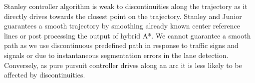 Stanley controller algorithm is weak to discontinuities along the trajectory as
it directly drives towards the closest point on the trajectory. Stanley and
Junior guarantees a smooth trajectory by smoothing already known center
reference lines or post processing the output of hybrid A*. We cannot guarantee
a smooth path as we use discontinuous predefined path in response to traffic
signs and signals or due to instantaneous segmentation errors in the lane
detection. Conversely, as pure pursuit controller drives along an arc it is
less likely to be affected by discontinuities.
